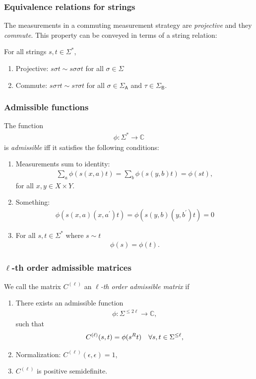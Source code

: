 \documentclass{beamer}
\def\complex{\mathbb{C}}
\def \SigmaA{\Sigma_{\reg{A}}}
\def \SigmaB{\Sigma_{\reg{B}}}
\newcommand{\reg}[1]{\mathsf{#1}}
\begin{document}
\begin{frame}
	\frametitle{Equivalence relations for strings}
The measurements in a commuting measurement strategy are \emph{projective} and they \emph{commute}. This property can be conveyed in terms of a string relation:
	\vspace{5mm}
	
	For all strings $s,t \in \Sigma^*$, 
	\begin{enumerate}
		\item Projective: $s \sigma t \sim s \sigma \sigma t$ for all $\sigma \in \Sigma$
		\item Commute: $s \sigma \tau t \sim s \tau \sigma t$ for all $\sigma \in \SigmaA$ and $\tau \in \SigmaB$. 
	\end{enumerate}
\end{frame}

\begin{frame}
	\frametitle{Admissible functions}	
	The function
		\begin{align*}
			\phi : \Sigma^* \rightarrow \complex
		\end{align*}
		is \emph{admissible} iff it satisfies the following conditions:
		\begin{enumerate}
			\item Measurements sum to identity:
				\begin{align*}
					\sum_a \phi(s(x,a)t) = \sum_b \phi(s(y,b)t) = \phi(st),
				\end{align*}
				for all $x,y \in X \times Y$. 
			\item Something:
				\begin{align*}
					\phi(s(x,a)(x,a^{\prime})t) = \phi(s(y,b)(y,b^{\prime})t) = 0
				\end{align*}
			\item For all $s,t \in \Sigma^*$ where $s \sim t$
				\begin{align*}
					\phi(s) = \phi(t).
				\end{align*}
		\end{enumerate}
\end{frame}

\begin{frame}
	\frametitle{$\ell$-th order admissible matrices}
	We call the matrix $C^{(\ell)}$ an \emph{$\ell$-th order admissible matrix} if 
	\begin{enumerate}
		\item There exists an admissible function 
			\begin{align*}
				\phi : \Sigma^{\leq 2 \ell} \rightarrow \complex,
			\end{align*}
			such that 
			\begin{align*}
				C^{(\ell)}(s,t) = \phi(s^{\tiny{R}}t) \quad \forall s,t \in \Sigma^{\leq \ell},
			\end{align*}
		\item Normalization: $C^{(\ell)}(\epsilon,\epsilon) = 1$,
		\item $C^{(\ell)}$ is positive semidefinite. 
	\end{enumerate}
\end{frame}
\end{document}
